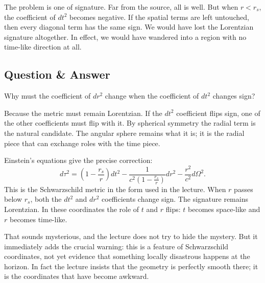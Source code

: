 The problem is one of signature. Far from the source, all is well. But when \(r<r_s\), the coefficient of \(dt^2\) becomes negative. If the spatial terms are left untouched, then every diagonal term has the same sign. We would have lost the Lorentzian signature altogether. In effect, we would have wandered into a region with no time-like direction at all.

\subsection{Question \& Answer}

Why must the coefficient of \(dr^2\) change when the coefficient of \(dt^2\) changes sign?

Because the metric must remain Lorentzian. If the \(dt^2\) coefficient flips sign, one of the other coefficients must flip with it. By spherical symmetry the radial term is the natural candidate. The angular sphere remains what it is; it is the radial piece that can exchange roles with the time piece.

Einstein's equations give the precise correction:
\begin{equation}
d\tau^2
=
\left(1-\frac{r_s}{r}\right)dt^2
-
\frac{1}{c^2\left(1-\frac{r_s}{r}\right)}dr^2
-
\frac{r^2}{c^2}d\Omega^2.
\end{equation}
This is the Schwarzschild metric in the form used in the lecture. When \(r\) passes below \(r_s\), both the \(dt^2\) and \(dr^2\) coefficients change sign. The signature remains Lorentzian. In these coordinates the role of \(t\) and \(r\) flips: \(t\) becomes space-like and \(r\) becomes time-like.

That sounds mysterious, and the lecture does not try to hide the mystery. But it immediately adds the crucial warning: this is a feature of Schwarzschild coordinates, not yet evidence that something locally disastrous happens at the horizon. In fact the lecture insists that the geometry is perfectly smooth there; it is the coordinates that have become awkward.

